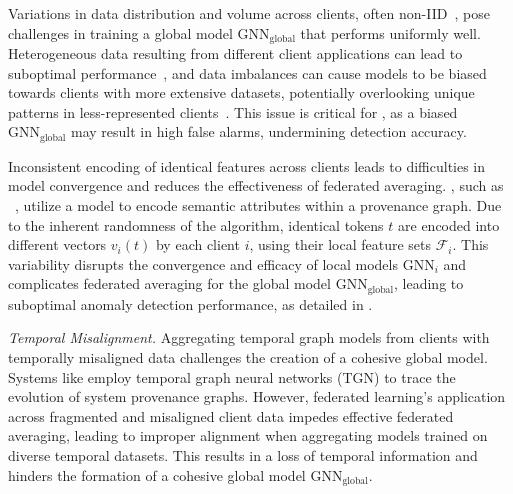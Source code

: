 \begin{enumerate}[itemsep=0.1em, parsep=0em, topsep=0em, leftmargin=*]
   Variations in data distribution and volume across clients, often non-IID~\cite{zhao2018federated}, pose challenges in training a global model \( \text{GNN}_{\text{global}} \) that performs uniformly well. Heterogeneous data resulting from different client applications can lead to suboptimal performance~\cite{qu2022rethinking}, and data imbalances can cause models to be biased towards clients with more extensive datasets, potentially overlooking unique patterns in less-represented clients~\cite{duan2020self}. This issue is critical for \pids, as a biased \( \text{GNN}_{\text{global}} \) may result in high false alarms, undermining detection accuracy.

   Inconsistent encoding of identical features across clients leads to difficulties in model convergence and reduces the effectiveness of federated averaging. \pids, such as \flash~\cite{cheng2023kairos}, utilize a \wordvec model to encode semantic attributes within a provenance graph. Due to the inherent randomness of the \wordvec algorithm, identical tokens \( t \) are encoded into different vectors \( v_i(t) \) by each client \( i \), using their local feature sets \( \mathcal{F}_i \). This variability disrupts the convergence and efficacy of local \gnn models \( \text{GNN}_{i} \) and complicates federated averaging for the global \gnn model \( \text{GNN}_{\text{global}} \), leading to suboptimal anomaly detection performance, as detailed in \cite{zhou2023fedfa}.

   {\it Temporal Misalignment.} Aggregating temporal graph models from clients with temporally misaligned data challenges the creation of a cohesive global model. Systems like \kairos \cite{cheng2023kairos} employ temporal graph neural networks (TGN) to trace the evolution of system provenance graphs. However, federated learning's application across fragmented and misaligned client data impedes effective federated averaging, leading to improper alignment when aggregating models trained on diverse temporal datasets. This results in a loss of temporal information and hinders the formation of a cohesive global model \( \text{GNN}_{\text{global}} \).
  
\end{enumerate}


